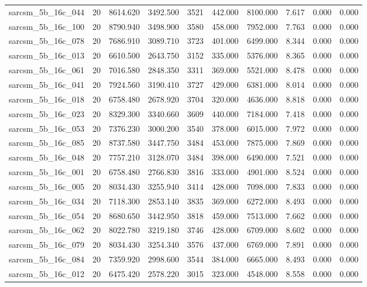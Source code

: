 \begin{tabular}{lrrrrrrrrr}
sarcsm\_5b\_16c\_044 & 20 & 8614.620 & 3492.500 & 3521 & 442.000 & 8100.000 & 7.617 & 0.000 & 0.000 \\
sarcsm\_5b\_16c\_100 & 20 & 8790.940 & 3498.900 & 3580 & 458.000 & 7952.000 & 7.763 & 0.000 & 0.000 \\
sarcsm\_5b\_16c\_078 & 20 & 7686.910 & 3089.710 & 3723 & 401.000 & 6499.000 & 8.344 & 0.000 & 0.000 \\
sarcsm\_5b\_16c\_013 & 20 & 6610.500 & 2643.750 & 3152 & 335.000 & 5376.000 & 8.365 & 0.000 & 0.000 \\
sarcsm\_5b\_16c\_061 & 20 & 7016.580 & 2848.350 & 3311 & 369.000 & 5521.000 & 8.478 & 0.000 & 0.000 \\
sarcsm\_5b\_16c\_041 & 20 & 7924.560 & 3190.410 & 3727 & 429.000 & 6381.000 & 8.014 & 0.000 & 0.000 \\
sarcsm\_5b\_16c\_018 & 20 & 6758.480 & 2678.920 & 3704 & 320.000 & 4636.000 & 8.818 & 0.000 & 0.000 \\
sarcsm\_5b\_16c\_023 & 20 & 8329.300 & 3340.660 & 3609 & 440.000 & 7184.000 & 7.418 & 0.000 & 0.000 \\
sarcsm\_5b\_16c\_053 & 20 & 7376.230 & 3000.200 & 3540 & 378.000 & 6015.000 & 7.972 & 0.000 & 0.000 \\
sarcsm\_5b\_16c\_085 & 20 & 8737.580 & 3447.750 & 3484 & 453.000 & 7875.000 & 7.869 & 0.000 & 0.000 \\
sarcsm\_5b\_16c\_048 & 20 & 7757.210 & 3128.070 & 3484 & 398.000 & 6490.000 & 7.521 & 0.000 & 0.000 \\
sarcsm\_5b\_16c\_001 & 20 & 6758.480 & 2766.830 & 3816 & 333.000 & 4901.000 & 8.524 & 0.000 & 0.000 \\
sarcsm\_5b\_16c\_005 & 20 & 8034.430 & 3255.940 & 3414 & 428.000 & 7098.000 & 7.833 & 0.000 & 0.000 \\
sarcsm\_5b\_16c\_034 & 20 & 7118.300 & 2853.140 & 3835 & 369.000 & 6272.000 & 8.493 & 0.000 & 0.000 \\
sarcsm\_5b\_16c\_054 & 20 & 8680.650 & 3442.950 & 3818 & 459.000 & 7513.000 & 7.662 & 0.000 & 0.000 \\
sarcsm\_5b\_16c\_062 & 20 & 8022.780 & 3219.180 & 3746 & 428.000 & 6709.000 & 8.602 & 0.000 & 0.000 \\
sarcsm\_5b\_16c\_079 & 20 & 8034.430 & 3254.340 & 3576 & 437.000 & 6769.000 & 7.891 & 0.000 & 0.000 \\
sarcsm\_5b\_16c\_084 & 20 & 7359.920 & 2998.600 & 3544 & 384.000 & 6665.000 & 8.493 & 0.000 & 0.000 \\
sarcsm\_5b\_16c\_012 & 20 & 6475.420 & 2578.220 & 3015 & 323.000 & 4548.000 & 8.558 & 0.000 & 0.000 \\

\end{tabular}
